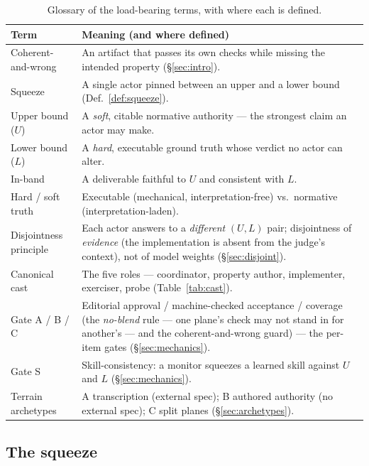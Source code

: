 \documentclass[11pt]{article}
\begin{document}
\begin{table}[t]
\centering\small
\begin{tabularx}{\textwidth}{@{}>{\raggedright\arraybackslash}p{3.0cm} Y@{}}
\toprule
\textbf{Term} & \textbf{Meaning (and where defined)} \\
\midrule
Coherent-and-wrong & An artifact that passes its own checks while missing the intended property (\S\ref{sec:intro}). \\
\addlinespace
Squeeze & A single actor pinned between an upper and a lower bound (Def.~\ref{def:squeeze}). \\
Upper bound ($U$) & A \emph{soft}, citable normative authority --- the strongest claim an actor may make. \\
Lower bound ($L$) & A \emph{hard}, executable ground truth whose verdict no actor can alter. \\
In-band & A deliverable faithful to $U$ and consistent with $L$. \\
Hard / soft truth & Executable (mechanical, interpretation-free) vs.\ normative (interpretation-laden). \\
\addlinespace
Disjointness principle & Each actor answers to a \emph{different} $(U,L)$ pair; disjointness of \emph{evidence} (the implementation is absent from the judge's context), not of model weights (\S\ref{sec:disjoint}). \\
Canonical cast & The five roles --- coordinator, property author, implementer, exerciser, probe (Table~\ref{tab:cast}). \\
\addlinespace
Gate A / B / C & Editorial approval / machine-checked acceptance / coverage (the \emph{no-blend} rule --- one plane's check may not stand in for another's --- and the coherent-and-wrong guard) --- the per-item gates (\S\ref{sec:mechanics}). \\
Gate S & Skill-consistency: a monitor squeezes a learned skill against $U$ and $L$ (\S\ref{sec:mechanics}). \\
\addlinespace
Terrain archetypes & A transcription (external spec); B authored authority (no external spec); C split planes (\S\ref{sec:archetypes}). \\
\bottomrule
\end{tabularx}
\caption{Glossary of the load-bearing terms, with where each is defined.}
\label{tab:glossary}
\end{table}

\subsection{The squeeze}
\end{document}

